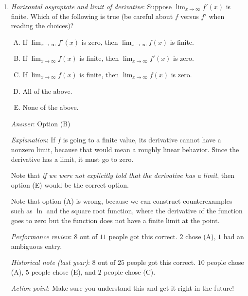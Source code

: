 \documentclass[10pt]{amsart}
\begin{document}
\begin{enumerate}
  {\em Answer}: Option (B)

  {\em Explanation}: Straightforward unraveling of the definition.

  {\em Performance review}: $11$ people got this.

  {\em Historical note (last year)}: $21$ out of $25$ people got this
  correct. $1$ person each chose options (A), (C), (D), and (E).

\item {\em Horizontal asymptote and limit of derivative}: Suppose
  $\lim_{x \to \infty} f'(x)$ is finite. Which of the following is
  true (be careful about $f$ versus $f'$ when reading the choices)?
  \begin{enumerate}[(A)]
  \item If $\lim_{x \to \infty} f'(x)$ is zero, then $\lim_{x \to
    \infty} f(x)$ is finite.
  \item If $\lim_{x \to \infty} f(x)$ is finite, then $\lim_{x \to
    \infty} f'(x)$ is zero.
  \item If $\lim_{x \to \infty} f(x)$ is finite, then $\lim_{x \to
    \infty} f(x)$ is zero.
  \item All of the above.
  \item None of the above.
  \end{enumerate}

  {\em Answer}: Option (B)

  {\em Explanation}: If $f$ is going to a finite value, its derivative
  cannot have a nonzero limit, because that would mean a roughly
  linear behavior. Since the derivative has a limit, it must go to
  zero.

  Note that {\em if we were not explicitly told that the derivative
    has a limit}, then option (E) would be the correct option.

  Note that option (A) is wrong, because we can construct
  counterexamples such as $\ln$ and the square root function, where
  the derivative of the function goes to zero but the function does
  not have a finite limit at the point.

  {\em Performance review}: $8$ out of $11$ people got this
  correct. $2$ chose (A), $1$ had an ambiguous entry.

  {\em Historical note (last year)}: $8$ out of $25$ people got this
  correct. $10$ people chose (A), $5$ people chose (E), and $2$ people
  chose (C).

  {\em Action point}: Make sure you understand this and get it right
  in the future!


\end{enumerate}
\end{document}
